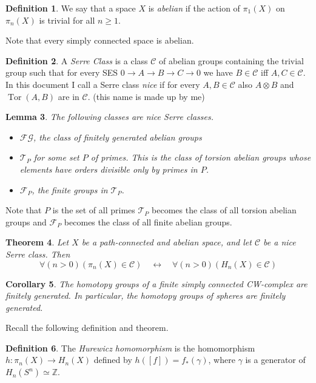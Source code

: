 \documentclass{article}
\newcommand{\mb}[1]{\mathbb{#1}}
\newcommand{\mc}[1]{\mathcal{#1}}
\newcommand{\Z}{\mb{Z}}
\DeclareMathOperator{\Tor}{Tor}
\newtheorem{theorem}{Theorem}[section]
\newtheorem{lemma}[theorem]{Lemma}
\newtheorem{corollary}[theorem]{Corollary}
\theoremstyle{definition}
\newtheorem{definition}[theorem]{Definition}
\theoremstyle{remark}
\begin{document}
\begin{definition}
We say that a space $X$ is \emph{abelian} if the action of $\pi_1(X)$ on $\pi_n(X)$ is trivial for all $n\geq 1$.
\end{definition}
Note that every simply connected space is abelian.
\begin{definition}
  A \emph{Serre Class} is a class $\mc C$ of abelian groups containing the trivial group such that for every SES $0\to A\to B\to C\to 0$ we have $B\in\mc C$ iff $A,C\in \mc C$. In this document I call a Serre class \emph{nice} if for every $A,B\in\mc C$ also $A\otimes B$ and $\Tor(A,B)$ are in $\mc C$. (this name is made up by me)
\end{definition}
\begin{lemma}
  The following classes are nice Serre classes.
\begin{itemize}
\item $\mc {FG}$, the class of finitely generated abelian groups
\item $\mc{T}_P$ for some set $P$ of primes. This is the class of torsion abelian groups whose
  elements have orders divisible only by primes in $P$.
\item $\mc{F}_P$, the finite groups in $\mc{T}_P$.
\end{itemize}
\end{lemma}
Note that $P$ is the set of all primes $\mc{T}_P$ becomes the class of all torsion abelian groups
and $\mc{F}_P$ becomes the class of all finite abelian groups.

\begin{theorem}
  Let $X$ be a path-connected and abelian space, and let $\mc C$ be a nice Serre class. Then
  $$\forall(n>0)(\pi_n(X)\in\mc{C})\quad \longleftrightarrow\quad \forall(n>0)(H_n(X)\in\mc{C})$$
\end{theorem}

\begin{corollary}
The homotopy groups of a finite simply connected CW-complex are finitely generated. In particular, the homotopy groups of spheres are finitely generated.
\end{corollary}

Recall the following definition and theorem.
\begin{definition}
The \emph{Hurewicz homomorphism} is the homomorphism $h : \pi_n(X) \to H_n(X)$ defined by $h([f])=f_*(\gamma)$, where $\gamma$ is a generator of $H_n(S^n)\simeq\Z$.
\end{definition}
\end{document}
